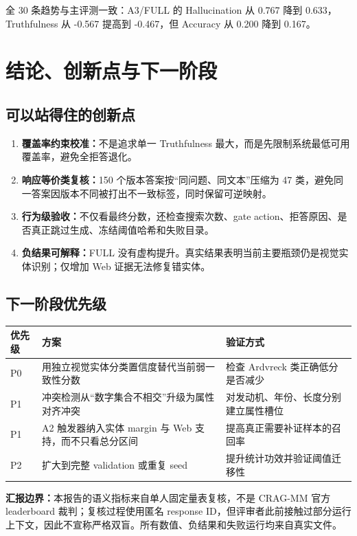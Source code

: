 \documentclass[11pt,a4paper,fontset=none]{ctexart}
\begin{document}
全 30 条趋势与主评测一致：A3/FULL 的 Hallucination 从 0.767 降到 0.633，Truthfulness 从 -0.567 提高到 -0.467，但 Accuracy 从 0.200 降到 0.167。

\section{结论、创新点与下一阶段}
\subsection{可以站得住的创新点}
\begin{enumerate}[leftmargin=1.6em]
  \item \textbf{覆盖率约束校准：}不是追求单一 Truthfulness 最大，而是先限制系统最低可用覆盖率，避免全拒答退化。
  \item \textbf{响应等价类复核：}150 个版本答案按“同问题、同文本”压缩为 47 类，避免同一答案因版本不同被打出不一致标签，同时保留可逆映射。
  \item \textbf{行为级验收：}不仅看最终分数，还检查搜索次数、gate action、拒答原因、是否真正跳过生成、冻结阈值哈希和失败目录。
  \item \textbf{负结果可解释：}FULL 没有虚构提升。真实结果表明当前主要瓶颈仍是视觉实体识别；仅增加 Web 证据无法修复错实体。
\end{enumerate}

\subsection{下一阶段优先级}
\begin{tabularx}{\textwidth}{@{}lYY@{}}
\toprule
优先级 & 方案 & 验证方式 \\
\midrule
P0 & 用独立视觉实体分类置信度替代当前弱一致性分数 & 检查 Ardvreck 类正确低分是否减少 \\
P1 & 冲突检测从“数字集合不相交”升级为属性对齐冲突 & 对发动机、年份、长度分别建立属性槽位 \\
P1 & A2 触发器纳入实体 margin 与 Web 支持，而不只看总分区间 & 提高真正需要补证样本的召回率 \\
P2 & 扩大到完整 validation 或重复 seed & 提升统计功效并验证阈值迁移性 \\
\bottomrule
\end{tabularx}

\begin{warnbox}
\textbf{汇报边界：}本报告的语义指标来自单人固定量表复核，不是 CRAG-MM 官方 leaderboard 裁判；复核过程使用匿名 response ID，但评审者此前接触过部分运行上下文，因此不宣称严格双盲。所有数值、负结果和失败运行均来自真实文件。
\end{warnbox}
\end{document}
